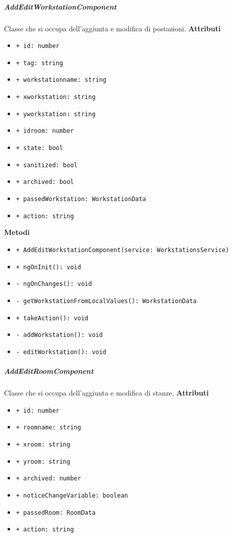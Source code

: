 \subparagraph{AddEditWorkstationComponent}
Classe che si occupa dell'aggiunta e modifica di postazioni.
\textbf{Attributi}
\begin{itemize}
	\item \texttt{+ id: number } 
	\item \texttt{+ tag: string } 
	\item \texttt{+ workstationname: string } 
	\item \texttt{+ xworkstation: string } 
	\item \texttt{+ yworkstation: string } 
	\item \texttt{+ idroom: number } 
	\item \texttt{+ state: bool } 
	\item \texttt{+ sanitized: bool } 
	\item \texttt{+ archived: bool } 
	\item \texttt{+ passedWorkstation: WorkstationData } 
	\item \texttt{+ action: string} 
\end{itemize}
\textbf{Metodi}
\begin{itemize}
	\item \texttt{+ AddEditWorkstationComponent(service: WorkstationsService) }
	\item \texttt{+ ngOnInit(): void }
	\item \texttt{- ngOnChanges(): void }
	\item \texttt{- getWorkstationFromLocalValues(): WorkstationData }
	\item \texttt{+ takeAction(): void }
	\item \texttt{- addWorkstation(): void }
	\item \texttt{- editWorkstation(): void}
\end{itemize}
\subparagraph{AddEditRoomComponent}
Classe che si occupa dell'aggiunta e modifica di stanze.
\textbf{Attributi}
\begin{itemize}
	\item \texttt{+ id: number 	}
	\item \texttt{+ roomname: string 	}
	\item \texttt{+ xroom: string 	}
	\item \texttt{+ yroom: string 	}
	\item \texttt{+ archived: number 	}
	\item \texttt{+ noticeChangeVariable: boolean 	}
	\item \texttt{+ passedRoom: RoomData 	}
	\item \texttt{+ action: string}
\end{itemize}
